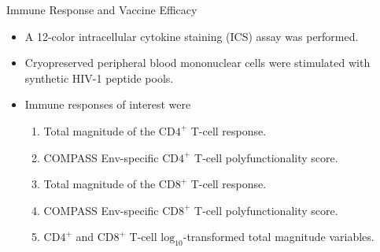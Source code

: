 \documentclass[12pt,t,handout]{beamer}
\begin{document}
\begin{frame}[c]{Immune Response and Vaccine Efficacy}
\begin{center}
\begin{itemize}
  \itemsep10pt
  \item A 12-color intracellular cytokine staining (ICS) assay was performed.
  \item Cryopreserved peripheral blood mononuclear cells were stimulated with
    synthetic HIV-1 peptide pools.
  \item Immune responses of interest were
    \begin{enumerate}
      \item Total magnitude of the $\text{CD4}^+$ T-cell response.
      \item COMPASS Env-specific $\text{CD4}^+$ T-cell polyfunctionality score.
      \item Total magnitude of the $\text{CD8}^+$ T-cell response.
      \item COMPASS Env-specific $\text{CD8}^+$ T-cell polyfunctionality score.
      \item $\text{CD4}^+$ and $\text{CD8}^+$ T-cell
        $\text{log}_{10}$-transformed total magnitude variables.
    \end{enumerate}
\end{itemize}
\end{center}

\end{frame}

\end{document}
